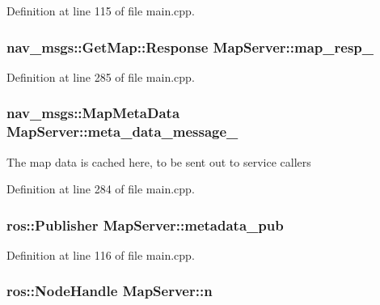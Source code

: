 Definition at line 115 of file main.\-cpp.

\hypertarget{classMapServer_ac1be64f4c32a295b8a0bd09e716aeb42}{
\subsubsection[{map\-\_\-resp\-\_\-}]{\setlength{\rightskip}{0pt plus 5cm}nav\-\_\-msgs\-::\-Get\-Map\-::\-Response Map\-Server\-::map\-\_\-resp\-\_\-\hspace{0.3cm}{\ttfamily [private]}}}\label{classMapServer_ac1be64f4c32a295b8a0bd09e716aeb42}


Definition at line 285 of file main.\-cpp.

\hypertarget{classMapServer_a5aca513fe2a230e89e41f700703ee477}{
\subsubsection[{meta\-\_\-data\-\_\-message\-\_\-}]{\setlength{\rightskip}{0pt plus 5cm}nav\-\_\-msgs\-::\-Map\-Meta\-Data Map\-Server\-::meta\-\_\-data\-\_\-message\-\_\-\hspace{0.3cm}{\ttfamily [private]}}}\label{classMapServer_a5aca513fe2a230e89e41f700703ee477}
The map data is cached here, to be sent out to service callers 

Definition at line 284 of file main.\-cpp.

\hypertarget{classMapServer_a39b9c75c5bb3ca55346ba696b9cdcbb0}{
\subsubsection[{metadata\-\_\-pub}]{\setlength{\rightskip}{0pt plus 5cm}ros\-::\-Publisher Map\-Server\-::metadata\-\_\-pub\hspace{0.3cm}{\ttfamily [private]}}}\label{classMapServer_a39b9c75c5bb3ca55346ba696b9cdcbb0}


Definition at line 116 of file main.\-cpp.

\hypertarget{classMapServer_a819c2adc93d1cb5175509f939de80b73}{
\subsubsection[{n}]{\setlength{\rightskip}{0pt plus 5cm}ros\-::\-Node\-Handle Map\-Server\-::n\hspace{0.3cm}{\ttfamily [private]}}}\label{classMapServer_a819c2adc93d1cb5175509f939de80b73}


